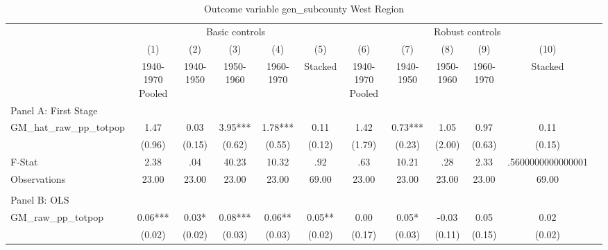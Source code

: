  \begin{table}[htbp]\centering {} \begin{threeparttable} \caption{Outcome variable gen\_subcounty West Region} \begin{tabular}{l*{11}{c}} \toprule
          &\multicolumn{5}{c}{Basic controls}                                   &\multicolumn{5}{c}{Robust controls}                                  \\\cmidrule(lr){2-6}\cmidrule(lr){7-11}
          &\multicolumn{1}{c}{(1)}&\multicolumn{1}{c}{(2)}&\multicolumn{1}{c}{(3)}&\multicolumn{1}{c}{(4)}&\multicolumn{1}{c}{(5)}&\multicolumn{1}{c}{(6)}&\multicolumn{1}{c}{(7)}&\multicolumn{1}{c}{(8)}&\multicolumn{1}{c}{(9)}&\multicolumn{1}{c}{(10)}\\
          &\multicolumn{1}{c}{1940-1970 Pooled}&\multicolumn{1}{c}{1940-1950}&\multicolumn{1}{c}{1950-1960}&\multicolumn{1}{c}{1960-1970}&\multicolumn{1}{c}{Stacked}&\multicolumn{1}{c}{1940-1970 Pooled}&\multicolumn{1}{c}{1940-1950}&\multicolumn{1}{c}{1950-1960}&\multicolumn{1}{c}{1960-1970}&\multicolumn{1}{c}{Stacked}\\
\cmidrule(lr){1-11}
\multicolumn{10}{l}{Panel A: First Stage}\\
\cmidrule(lr){1-11}
GM\_hat\_raw\_pp\_totpop&      1.47   &      0.03   &      3.95***&      1.78***&      0.11   &      1.42   &      0.73***&      1.05   &      0.97   &      0.11   \\
          &    (0.96)   &    (0.15)   &    (0.62)   &    (0.55)   &    (0.12)   &    (1.79)   &    (0.23)   &    (2.00)   &    (0.63)   &    (0.15)   \\
\midrule
F-Stat    &      2.38   &       .04   &     40.23   &     10.32   &       .92   &       .63   &     10.21   &       .28   &      2.33   &.5600000000000001   \\
Observations&     23.00   &     23.00   &     23.00   &     23.00   &     69.00   &     23.00   &     23.00   &     23.00   &     23.00   &     69.00   \\
\cmidrule[\heavyrulewidth](lr){1-11} \\ \cmidrule[\heavyrulewidth](lr){1-11}
\multicolumn{10}{l}{Panel B: OLS}\\
\cmidrule(lr){1-11}
GM\_raw\_pp\_totpop&      0.06***&      0.03*  &      0.08***&      0.06** &      0.05** &      0.00   &      0.05*  &     -0.03   &      0.05   &      0.02   \\
          &    (0.02)   &    (0.02)   &    (0.03)   &    (0.03)   &    (0.02)   &    (0.17)   &    (0.03)   &    (0.11)   &    (0.15)   &    (0.02)   \\

\end{tabular}
\end{threeparttable}
\end{table}
